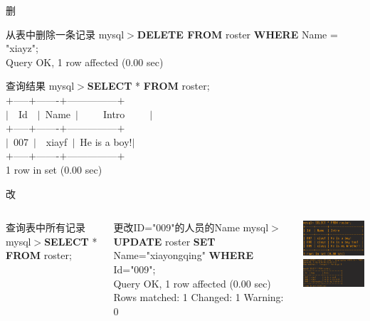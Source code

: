 \documentclass[CJK]{beamer}
\begin{document}
\begin{CJK*}{UTF8}{gbsn}
\begin{frame}{删}
	\begin{block}{从表中删除一条记录}
	mysql$>${\bf DELETE FROM} roster {\bf WHERE} Name = "xiayz";\\
	Query OK, 1 row affected (0.00 sec)
	\end{block}
	\begin{block}{查询结果}
	mysql$>${\bf SELECT} * {\bf FROM} roster;\\
	{\color{blue}
	$+$-----$+$-------$+$---------------$+$\\
	$\mid$\ \ Id\ \ $\mid$\ Name\ $\mid$\ \ \ \ \ Intro\ \ \ \ \ $\mid$\\
	$+$-----$+$-------$+$---------------$+$\\
	$\mid$\ 007\ $\mid$\ \ xiayf\ $\mid$\ He is a boy!$\mid$\\
	$+$-----$+$-------$+$---------------$+$\\
	1 row in set (0.00 sec)}
	\end{block}
\end{frame}

\begin{frame}{改}
\begin{columns}
	\column[t]{5cm}
	{\small
	\begin{block}{查询表中所有记录}
	mysql$>${\bf SELECT} * {\bf FROM} roster;
	\end{block}
	\begin{block}{更改ID="009"的人员的Name}
	{\tiny
	mysql$>${\bf UPDATE} roster {\bf SET} Name="xiayongqing" {\bf WHERE} Id="009";\\
	{\color{blue}Query OK, 1 row affected (0.00 sec)\\
	Rows matched: 1 Changed: 1 Warning: 0}
	}
	\end{block}
	}
	\column[t]{5cm}
	\begin{flushright}
	\includegraphics[width=4cm]{selectBeforeDelete.png}\\
	
	\includegraphics[width=6cm]{deleteAndSelect.png}
	\end{flushright}
\end{columns}
\end{frame}


\end{CJK*}
\end{document}
